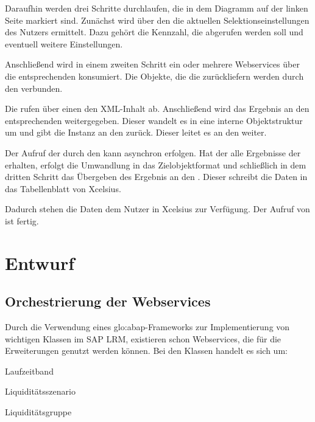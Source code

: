 \begin{onehalfspacing}
Daraufhin werden drei Schritte durchlaufen, die in dem Diagramm auf der linken Seite markiert sind. Zunächst wird über den  die aktuellen Selektionseinstellungen des Nutzers ermittelt. Dazu gehört die Kennzahl, die abgerufen werden soll und eventuell weitere Einstellungen.

Anschließend wird in einem zweiten Schritt ein oder mehrere Webservices über die entsprechenden  konsumiert. Die Objekte, die die  zurückliefern werden durch den  verbunden.

Die  rufen über einen  den \gls{XML}-Inhalt ab. Anschließend wird das Ergebnis an den entsprechenden  weitergegeben. Dieser wandelt es in eine interne Objektstruktur um und gibt die Instanz an den  zurück. Dieser leitet es an den  weiter.

Der Aufruf der  durch den  kann asynchron erfolgen. Hat der  alle Ergebnisse der  erhalten, erfolgt die Umwandlung in das Zielobjektformat und schließlich in dem dritten Schritt das Übergeben des Ergebnis an den . Dieser schreibt die Daten in das Tabellenblatt von \gls{Xcelsius}.

Dadurch stehen die Daten dem Nutzer in \gls{Xcelsius} zur Verfügung. Der Aufruf von  ist fertig.

\section{Entwurf}

\subsection{Orchestrierung der Webservices}
Durch die Verwendung eines \gls{glo:abap}-Frameworks zur Implementierung von wichtigen Klassen im SAP LRM, existieren schon Webservices, die für die Erweiterungen genutzt werden können. Bei den Klassen handelt es sich um:

\begin{seList}
\item Laufzeitband
\item Liquiditätsszenario
\item Liquiditätsgruppe
\end{seList}


\end{onehalfspacing}
